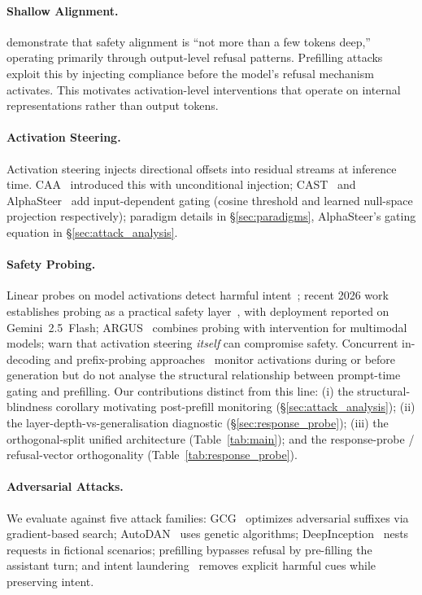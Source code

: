 \documentclass{article}
\begin{document}
\paragraph{Shallow Alignment.}
\citet{qi2026safety} demonstrate that safety alignment is ``not more than a few tokens deep,'' operating primarily through output-level refusal patterns. Prefilling attacks exploit this by injecting compliance before the model's refusal mechanism activates. This motivates activation-level interventions that operate on internal representations rather than output tokens.

\paragraph{Activation Steering.}
Activation steering injects directional offsets into residual streams at inference time. CAA~\citep{turner2023activation} introduced this with unconditional injection; CAST~\citep{cast2025} and AlphaSteer~\citep{alphasteer2026} add input-dependent gating (cosine threshold and learned null-space projection respectively); paradigm details in \S\ref{sec:paradigms}, AlphaSteer's gating equation in \S\ref{sec:attack_analysis}.

\paragraph{Safety Probing.}
Linear probes on model activations detect harmful intent~\citep{tpc2026}; recent 2026 work establishes probing as a practical safety layer~\citep{segmentcoherence2026,aisa2026,gemma2probe2026,safeprobing2026}, with deployment reported on Gemini~2.5~Flash; ARGUS~\citep{argus2025} combines probing with intervention for multimodal models; \citet{roguescalpel2025} warn that activation steering \emph{itself} can compromise safety. Concurrent in-decoding and prefix-probing approaches~\citep{safeprobing2026} monitor activations during or before generation but do not analyse the structural relationship between prompt-time gating and prefilling. Our contributions distinct from this line: (i) the structural-blindness corollary motivating post-prefill monitoring (\S\ref{sec:attack_analysis}); (ii) the layer-depth-vs-generalisation diagnostic (\S\ref{sec:response_probe}); (iii) the orthogonal-split unified architecture (Table~\ref{tab:main}); and the response-probe / refusal-vector orthogonality (Table~\ref{tab:response_probe}).

\paragraph{Adversarial Attacks.}
We evaluate against five attack families: GCG~\citep{zou2023universal} optimizes adversarial suffixes via gradient-based search; AutoDAN~\citep{liu2023autodan} uses genetic algorithms; DeepInception~\citep{li2023deepinception} nests requests in fictional scenarios; prefilling bypasses refusal by pre-filling the assistant turn; and intent laundering~\citep{golchin2026intent} removes explicit harmful cues while preserving intent.
\end{document}
